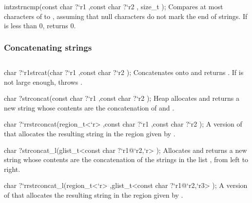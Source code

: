 \begin{defun2}{int}{zstrncmp}{(const char {?}`r1 ,const char {?}`r2 , size_t );}
  Compares at most  characters of  to ,
  assuming that null characters do not mark the end of strings.  If
   is less than 0,  returns 0.
\end{defun2}

\subsubsection*{Concatenating strings}

\begin{verbatim}
\end{verbatim}

\begin{defun2}{char {?}`r1}{strcat}{(char {?}`r1 ,const char {?}`r2 );}
  Concatenates  onto  and returns .
  If  is not large enough,  throws
  .
\end{defun2}

\begin{defun2}{char ?}{strconcat}{(const char {?}`r1 ,const char {?}`r2 );}
  Heap allocates and returns a new string whose contents are the
  concatenation of  and .
\end{defun2}

\begin{defun2}{char {?}`r}{rstrconcat(region_t<`r> ,const char {?}`r1 ,const char {?}`r2 );}
  A version of  that allocates the resulting string in
  the region given by .
\end{defun2}

\begin{defun2}{char ?}{strconcat_l}{(glist_t<const char {?}`r1@`r2,`r> );}
  Allocates and returns a new string whose contents are the
  concatenation of the strings in the list , from left to
  right.
\end{defun2}

\begin{defun2}{char {?}`r}{rstrconcat_l}{(region_t<`r> ,glist_t<const char {?}`r1@`r2,`r3> );}
  A version of  that allocates the resulting string
  in the region given by .
\end{defun2}

